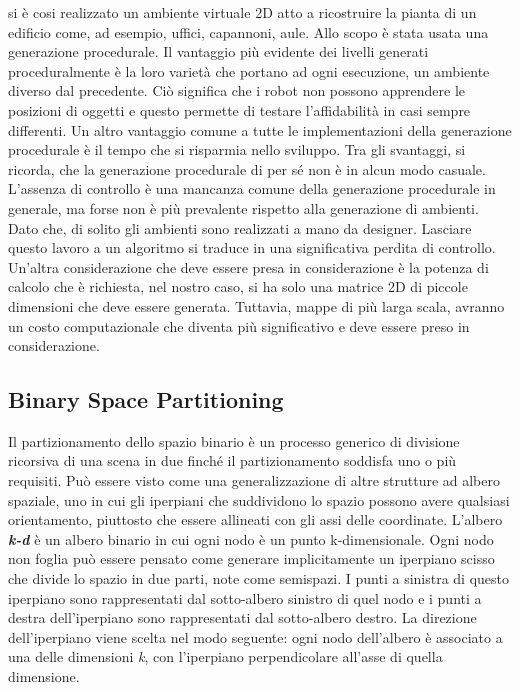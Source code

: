 si è cosi realizzato un ambiente virtuale 2D atto a ricostruire 
la pianta di un edificio come, ad esempio, uffici, capannoni, aule. Allo scopo 
è stata usata una generazione procedurale.
Il vantaggio più evidente dei livelli generati proceduralmente è la loro varietà 
che portano ad ogni esecuzione, un ambiente diverso dal precedente. 
Ciò significa che i robot non possono apprendere le posizioni di oggetti e 
questo permette di testare l'affidabilità in casi sempre differenti.
Un altro vantaggio comune a tutte le implementazioni della generazione 
procedurale è il tempo che si risparmia nello sviluppo. 
Tra gli svantaggi, si ricorda, che la generazione procedurale di per sé non è 
in alcun modo casuale. 
L'assenza di controllo è una mancanza comune della generazione procedurale in 
generale, ma forse non è più prevalente rispetto alla generazione di ambienti.
Dato che, di solito gli ambienti sono realizzati a mano da designer. 
Lasciare questo lavoro a un algoritmo si traduce in una significativa perdita di 
controllo.
Un'altra considerazione che deve essere presa in considerazione è la potenza di 
calcolo che è richiesta, nel nostro caso, si ha solo una matrice 2D di piccole 
dimensioni che deve essere generata. Tuttavia, mappe di più larga scala, avranno
un costo computazionale che diventa più significativo e deve essere preso in 
considerazione.\cite{green2016procedural}

\subsection{Binary Space Partitioning}
Il partizionamento dello spazio binario è un processo generico di divisione 
ricorsiva di una scena in due finché il partizionamento soddisfa uno o più requisiti.
Può essere visto come una generalizzazione di altre strutture ad albero spaziale, 
uno in cui gli iperpiani che suddividono lo spazio possono avere qualsiasi 
orientamento, piuttosto che essere allineati con gli assi delle coordinate.\cite{wiki:bsp}
L'albero \textbf{\emph{k-d}} è un albero binario in cui ogni nodo è un punto 
k-dimensionale. Ogni nodo non foglia può essere pensato come generare 
implicitamente un iperpiano scisso che divide lo spazio in due parti, note come
semispazi. I punti a sinistra di questo iperpiano sono rappresentati dal 
sotto-albero sinistro di quel nodo e i punti a destra dell'iperpiano sono 
rappresentati dal sotto-albero destro. La direzione dell'iperpiano viene scelta 
nel modo seguente: ogni nodo dell'albero è associato a una delle dimensioni \emph{k}, 
con l'iperpiano perpendicolare all'asse di quella dimensione.\cite{wiki:kdtree}

